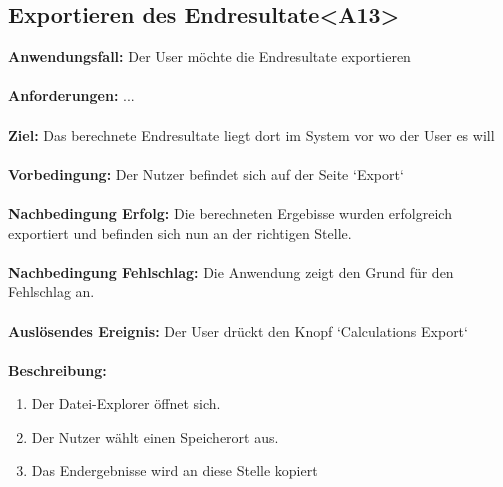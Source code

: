 \documentclass[parskip=full]{scrartcl} %
\begin{document}
\subsection*{Exportieren des Endresultate<A13>}
\textbf{Anwendungsfall:} Der User möchte die Endresultate exportieren\\\\
\textbf{Anforderungen:} ...\\\\
\textbf{Ziel:} Das berechnete Endresultate liegt dort im System vor wo der User es will \\\\
\textbf{Vorbedingung:}  Der Nutzer befindet sich auf der Seite `Export`\\\\
\textbf{Nachbedingung Erfolg:} Die berechneten Ergebisse wurden erfolgreich exportiert und befinden sich nun an der richtigen Stelle. \\\\
\textbf{Nachbedingung Fehlschlag:} Die Anwendung zeigt den Grund für den Fehlschlag an.\\\\
\textbf{Auslösendes Ereignis:} Der User drückt den Knopf `Calculations Export` \\\\
\textbf{Beschreibung:}
\begin{enumerate}
    \item Der Datei-Explorer öffnet sich.
    \item Der Nutzer wählt einen Speicherort aus.
    \item Das Endergebnisse wird an diese Stelle kopiert
\end{enumerate}
\newpage
\end{document}
